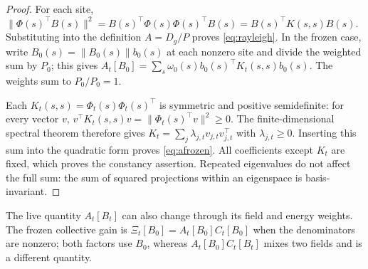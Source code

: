 \begin{proof}
For each site,
$\|\Phi(s)^\top B(s)\|^2=B(s)^\top\Phi(s)\Phi(s)^\top B(s)=B(s)^\top K(s,s)B(s)$.
Substituting into the definition $A=D_g/P$ proves \cref{eq:rayleigh}. In the frozen case, write $B_0(s)=\|B_0(s)\|b_0(s)$ at each nonzero site and divide the weighted sum by $P_0$; this gives $A_t[B_0]=\sum_s\omega_0(s)b_0(s)^\top K_t(s,s)b_0(s)$. The weights sum to $P_0/P_0=1$.

Each $K_t(s,s)=\Phi_t(s)\Phi_t(s)^\top$ is symmetric and positive semidefinite: for every vector $v$, $v^\top K_t(s,s)v=\|\Phi_t(s)^\top v\|^2\ge0$. The finite-dimensional spectral theorem therefore gives $K_t=\sum_j\lambda_{j,t}v_{j,t}v_{j,t}^\top$ with $\lambda_{j,t}\ge0$. Inserting this sum into the quadratic form proves \cref{eq:afrozen}. All coefficients except $K_t$ are fixed, which proves the constancy assertion. Repeated eigenvalues do not affect the full sum: the sum of squared projections within an eigenspace is basis-invariant.
\end{proof}

The live quantity $A_t[B_t]$ can also change through its field and energy weights. The frozen collective gain is $\Xi_t[B_0]=A_t[B_0]C_t[B_0]$ when the denominators are nonzero; both factors use $B_0$, whereas $A_t[B_0]C_t[B_t]$ mixes two fields and is a different quantity.


